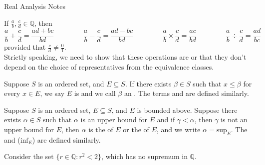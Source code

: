\documentclass[11pt,letterpaper]{jacky}
\newcommand{\Qq}{\mathbb{Q}}
\newcommand{\sup}[1]{\text{sup}_{#1}}
\newcommand{\inf}[1]{\text{inf}_{#1}}
\begin{document}
\begin{center}
    \vspace*{20pt}
    \LARGE{Real Analysis Notes}
\end{center}

If $\frac{a}{b},\frac{c}{d}\in\Qq$, then
$$\frac{a}{b}+\frac{c}{d}=\frac{ad+bc}{bd} \hspace{50pt}
\frac{a}{b}-\frac{c}{d}=\frac{ad-bc}{bd} \hspace{50pt}
\frac{a}{b}\times\frac{c}{d}=\frac{ac}{bd} \hspace{50pt}
\frac{a}{b}\div\frac{c}{d}=\frac{ad}{bc}$$
provided that $\frac{c}{d}\neq\frac{0}{1}$.\\

Strictly speaking, we need to show that these operations are
 or that they don't depend on the choice of
representatives from the equivalence classes.

\begin{defi}
    Suppose $S$ is an ordered set, and $E\subseteq S$. If there exists
    $\beta\in S$ such that $x\leq \beta$ for every $x\in E$, we say $E$ is
     and we call $\beta$ an . The
    terms  and  are defined
    similarly.
\end{defi}

\begin{defi}
        Suppose $S$ is an ordered set, $E\subseteq S$, and $E$ is bounded
        above. Suppose there exists $\alpha\in S$ such that $\alpha$ is an
        upper bound for $E$ and if $\gamma<\alpha$, then $\gamma$ is not an
        upper bound for $E$, then $\alpha$ is the  of
        $E$ or the  of $E$, and we write $\alpha=\sup{E}$. The
         and  ($\inf{E}$) are
        defined similarly.
\end{defi}

\begin{ex}
    Consider the set $\{r\in\Qq:r^2<2\}$, which has no supremum in $\Qq$.
\end{ex}
\end{document}
